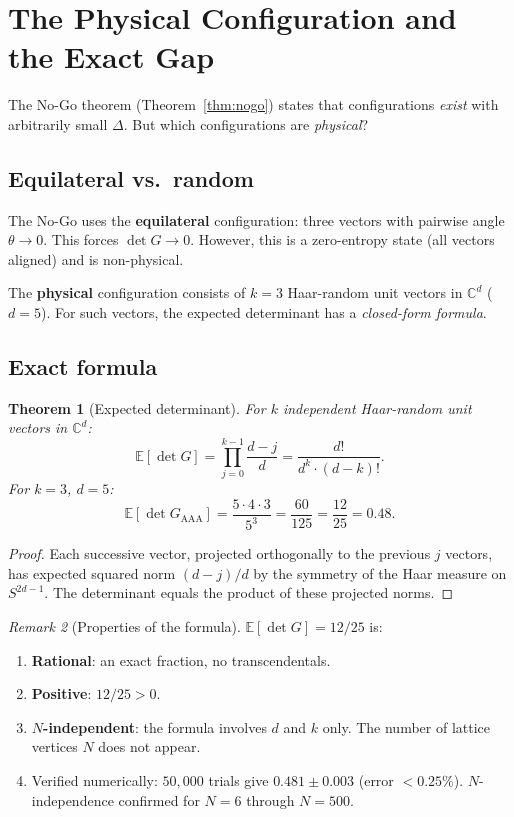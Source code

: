 \documentclass[12pt]{article}
\newtheorem{theorem}{Theorem}[section]
\theoremstyle{definition}
\theoremstyle{remark}
\newtheorem{remark}[theorem]{Remark}
\newcommand{\CC}{\mathbb{C}}
\begin{document}
\section{The Physical Configuration and the Exact Gap}

The No-Go theorem (Theorem~\ref{thm:nogo}) states that configurations
\emph{exist} with arbitrarily small $\Delta$. But which configurations
are \emph{physical}?

\subsection{Equilateral vs.\ random}

The No-Go uses the \textbf{equilateral} configuration: three vectors
with pairwise angle $\theta \to 0$. This forces $\det G \to 0$.
However, this is a zero-entropy state (all vectors aligned) and is
non-physical.

The \textbf{physical} configuration consists of $k = 3$ Haar-random
unit vectors in $\CC^d$ ($d = 5$). For such vectors, the expected
determinant has a \emph{closed-form formula}.

\subsection{Exact formula}

\begin{theorem}[Expected determinant]\label{thm:exact}
For $k$ independent Haar-random unit vectors in $\CC^d$:
\[
  \mathbb{E}[\det G] = \prod_{j=0}^{k-1} \frac{d - j}{d}
  = \frac{d!}{d^k \cdot (d - k)!}.
\]
For $k = 3$, $d = 5$:
\[
  \mathbb{E}[\det G_{\mathrm{AAA}}]
  = \frac{5 \cdot 4 \cdot 3}{5^3}
  = \frac{60}{125}
  = \frac{12}{25}
  = 0.48.
\]
\end{theorem}

\begin{proof}
Each successive vector, projected orthogonally to the
previous $j$ vectors, has expected squared norm $(d-j)/d$
by the symmetry of the Haar measure on $S^{2d-1}$.
The determinant equals the product of these projected norms.
\end{proof}

\begin{remark}[Properties of the formula]
$\mathbb{E}[\det G] = 12/25$ is:
\begin{enumerate}
\item \textbf{Rational}: an exact fraction, no transcendentals.
\item \textbf{Positive}: $12/25 > 0$.
\item \textbf{$N$-independent}: the formula involves $d$ and $k$ only.
  The number of lattice vertices $N$ does not appear.
\item Verified numerically: $50{,}000$ trials give
  $0.481 \pm 0.003$ (error $< 0.25\%$).
  $N$-independence confirmed for $N = 6$ through $N = 500$.
\end{enumerate}
\end{remark}
\end{document}
